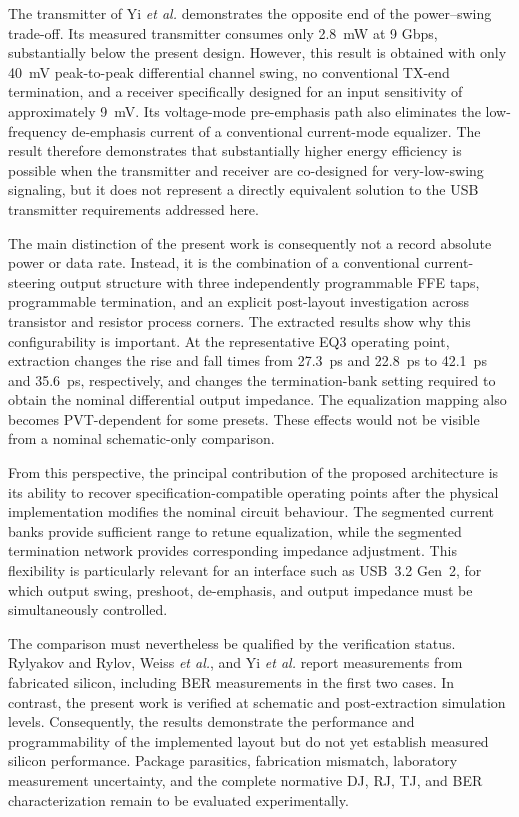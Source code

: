 The transmitter of Yi \textit{et al.} \cite{yi2016} demonstrates the opposite end of the power--swing trade-off. Its measured transmitter consumes only \SI{2.8}{\milli\watt} at 9 Gbps, substantially below the present design. However, this result is obtained with only \SI{40}{\milli\volt} peak-to-peak differential channel swing, no conventional \ac{TX}-end termination, and a receiver specifically designed for an input sensitivity of approximately \SI{9}{\milli\volt}. Its voltage-mode pre-emphasis path also eliminates the low-frequency de-emphasis current of a conventional current-mode equalizer. The result therefore demonstrates that substantially higher energy efficiency is possible when the transmitter and receiver are co-designed for very-low-swing signaling, but it does not represent a directly equivalent solution to the \ac{USB} transmitter requirements addressed here.

The main distinction of the present work is consequently not a record absolute power or data rate. Instead, it is the combination of a conventional current-steering output structure with three independently programmable \ac{FFE} taps, programmable termination, and an explicit post-layout investigation across transistor and resistor process corners. The extracted results show why this configurability is important. At the representative EQ3 operating point, extraction changes the rise and fall times from \SI{27.3}{\pico\second} and \SI{22.8}{\pico\second} to \SI{42.1}{\pico\second} and \SI{35.6}{\pico\second}, respectively, and changes the termination-bank setting required to obtain the nominal differential output impedance. The equalization mapping also becomes \ac{PVT}-dependent for some presets. These effects would not be visible from a nominal schematic-only comparison.

From this perspective, the principal contribution of the proposed architecture is its ability to recover specification-compatible operating points after the physical implementation modifies the nominal circuit behaviour. The segmented current banks provide sufficient range to retune equalization, while the segmented termination network provides corresponding impedance adjustment. This flexibility is particularly relevant for an interface such as \ac{USB}~3.2 Gen~2, for which output swing, preshoot, de-emphasis, and output impedance must be simultaneously controlled.

The comparison must nevertheless be qualified by the verification status. Rylyakov and Rylov, Weiss \textit{et al.}, and Yi \textit{et al.} report measurements from fabricated silicon, including \ac{BER} measurements in the first two cases. In contrast, the present work is verified at schematic and post-extraction simulation levels. Consequently, the results demonstrate the performance and programmability of the implemented layout but do not yet establish measured silicon performance. Package parasitics, fabrication mismatch, laboratory measurement uncertainty, and the complete normative \ac{DJ}, \ac{RJ}, \ac{TJ}, and \ac{BER} characterization remain to be evaluated experimentally.